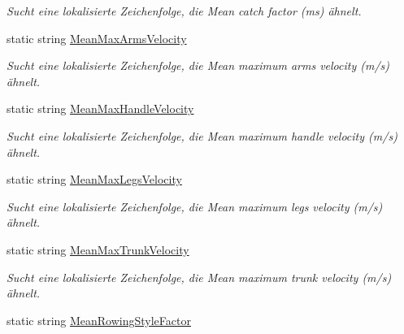 \begin{DoxyCompactItemize}
\begin{DoxyCompactList}\small\item\em Sucht eine lokalisierte Zeichenfolge, die Mean catch factor (ms) ähnelt. \end{DoxyCompactList}\item 
static string \hyperlink{class_rowing_monitor_1_1_properties_1_1_resources_aefe138efd7d84e783a37820fd4655069}{Mean\+Max\+Arms\+Velocity}
\begin{DoxyCompactList}\small\item\em Sucht eine lokalisierte Zeichenfolge, die Mean maximum arms velocity (m/s) ähnelt. \end{DoxyCompactList}\item 
static string \hyperlink{class_rowing_monitor_1_1_properties_1_1_resources_a9259f46ec2e511e16397345db30b083c}{Mean\+Max\+Handle\+Velocity}
\begin{DoxyCompactList}\small\item\em Sucht eine lokalisierte Zeichenfolge, die Mean maximum handle velocity (m/s) ähnelt. \end{DoxyCompactList}\item 
static string \hyperlink{class_rowing_monitor_1_1_properties_1_1_resources_a2254769cd88372fb92595fc59c36e0ad}{Mean\+Max\+Legs\+Velocity}
\begin{DoxyCompactList}\small\item\em Sucht eine lokalisierte Zeichenfolge, die Mean maximum legs velocity (m/s) ähnelt. \end{DoxyCompactList}\item 
static string \hyperlink{class_rowing_monitor_1_1_properties_1_1_resources_ae8925670637fe28af1a497d4d9e99f1f}{Mean\+Max\+Trunk\+Velocity}
\begin{DoxyCompactList}\small\item\em Sucht eine lokalisierte Zeichenfolge, die Mean maximum trunk velocity (m/s) ähnelt. \end{DoxyCompactList}\item 
static string \hyperlink{class_rowing_monitor_1_1_properties_1_1_resources_a6a72ee7d9006274b2c616410c5dc89bf}{Mean\+Rowing\+Style\+Factor}

\end{DoxyCompactItemize}
